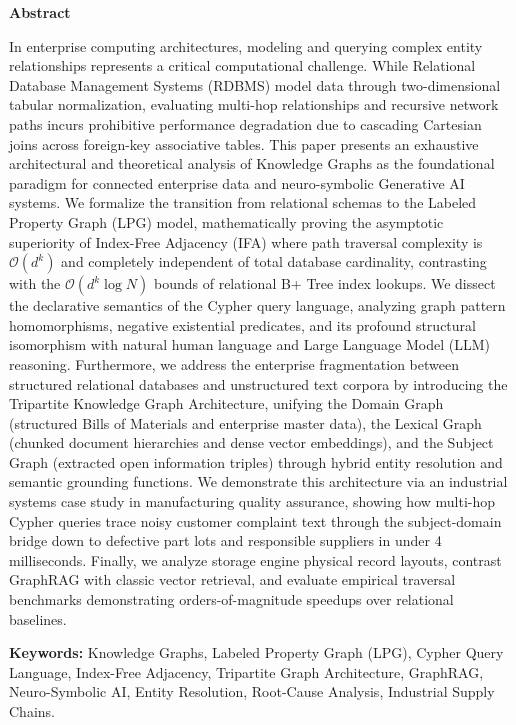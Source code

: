 \documentclass[10pt,twocolumn,letterpaper]{article}
\begin{document}
\begin{center}
  {\bfseries\large Abstract}
\end{center}
\vspace{-0.5em}
{\small In enterprise computing architectures, modeling and querying complex entity relationships represents a critical computational challenge. While Relational Database Management Systems (RDBMS) model data through two-dimensional tabular normalization, evaluating multi-hop relationships and recursive network paths incurs prohibitive performance degradation due to cascading Cartesian joins across foreign-key associative tables. This paper presents an exhaustive architectural and theoretical analysis of Knowledge Graphs as the foundational paradigm for connected enterprise data and neuro-symbolic Generative AI systems. We formalize the transition from relational schemas to the Labeled Property Graph (LPG) model, mathematically proving the asymptotic superiority of Index-Free Adjacency (IFA) where path traversal complexity is $\mathcal{O}(d^k)$ and completely independent of total database cardinality, contrasting with the $\mathcal{O}(d^k \log N)$ bounds of relational B+ Tree index lookups. We dissect the declarative semantics of the Cypher query language, analyzing graph pattern homomorphisms, negative existential predicates, and its profound structural isomorphism with natural human language and Large Language Model (LLM) reasoning. Furthermore, we address the enterprise fragmentation between structured relational databases and unstructured text corpora by introducing the Tripartite Knowledge Graph Architecture, unifying the Domain Graph (structured Bills of Materials and enterprise master data), the Lexical Graph (chunked document hierarchies and dense vector embeddings), and the Subject Graph (extracted open information triples) through hybrid entity resolution and semantic grounding functions. We demonstrate this architecture via an industrial systems case study in manufacturing quality assurance, showing how multi-hop Cypher queries trace noisy customer complaint text through the subject-domain bridge down to defective part lots and responsible suppliers in under 4 milliseconds. Finally, we analyze storage engine physical record layouts, contrast GraphRAG with classic vector retrieval, and evaluate empirical traversal benchmarks demonstrating orders-of-magnitude speedups over relational baselines.}

\vspace{1.0em}
\noindent\textbf{Keywords:} Knowledge Graphs, Labeled Property Graph (LPG), Cypher Query Language, Index-Free Adjacency, Tripartite Graph Architecture, GraphRAG, Neuro-Symbolic AI, Entity Resolution, Root-Cause Analysis, Industrial Supply Chains.
\vspace{1.2em}
\end{document}
